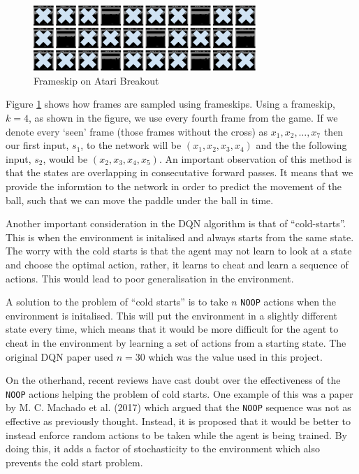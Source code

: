 \begin{figure}[htbp]
  \centering
  \includegraphics[width=0.75\textwidth]{chapters/chapter4/images/frameskip.png}
  \caption{Frameskip on Atari Breakout
    \label{fig:frameskip}
  }
\end{figure}

Figure \ref{fig:frameskip} shows how frames are sampled using frameskips. Using a frameskip, $k = 4$, as shown in the figure, we use every fourth frame from the game. If we denote every `seen' frame (those frames without the cross) as $x_1, x_2, \hdots, x_7$ then our first input, $s_1$, to the network will be $(x_1, x_2, x_3, x_4)$ and the the following input, $s_2$, would be $(x_2, x_3, x_4, x_5)$. An important observation of this method is that the states are overlapping in consecutative forward passes. It means that we provide the informtion to the network in order to predict the movement of the ball, such that we can move the paddle under the ball in time.

Another important consideration in the DQN algorithm is that of ``cold-starts''. This is when the environment is initalised and always starts from the same state. The worry with the cold starts is that the agent may not learn to look at a state and choose the optimal action, rather, it learns to cheat and learn a sequence of actions. This would lead to poor generalisation in the environment.

A solution to the problem of ``cold starts'' is to take $n$ \texttt{NOOP} actions when the environment is initalised. This will put the environment in a slightly different state every time, which means that it would be more difficult for the agent to cheat in the environment by learning a set of actions from a starting state. The original DQN paper \cite{dqn} used $n = 30$ which was the value used in this project.

On the otherhand, recent reviews have cast doubt over the effectiveness of the \texttt{NOOP} actions helping the problem of cold starts. One example of this was a paper by M. C. Machado et al. (2017) \cite{machado2017revisiting} which argued that the \texttt{NOOP} sequence was not as effective as previously thought. Instead, it is proposed that it would be better to instead enforce random actions to be taken while the agent is being trained. By doing this, it adds a factor of stochasticity to the environment which also prevents the cold start problem.


